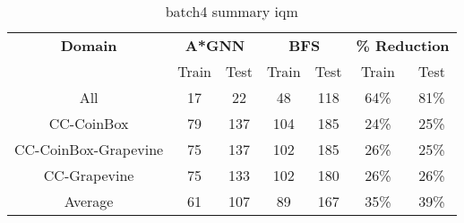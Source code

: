 \begin{table}[!ht]
  \small
  \centering
  \begin{tabular}{c|cc|cc|cc}
    \textbf{Domain}
      & \multicolumn{2}{c|}{\textbf{A*GNN}}
      & \multicolumn{2}{c|}{\textbf{BFS}}
      & \multicolumn{2}{c}{\textbf{\% Reduction}} \\
    \cline{2-7}
    & Train & Test & Train & Test & Train & Test \\
    \hline

    All & 17 & 22 & 48 & 118 & 64\% & 81\% \\
    CC-CoinBox & 79 & 137 & 104 & 185 & 24\% & 25\% \\
    CC-CoinBox-Grapevine & 75 & 137 & 102 & 185 & 26\% & 25\% \\
    CC-Grapevine & 75 & 133 & 102 & 180 & 26\% & 26\% \\
    \hline
    Average & 61 & 107 & 89 & 167 & 35\% & 39\% \\

  \end{tabular}
  \caption{batch4 summary iqm}
  \label{tab:batch4_res}
\end{table}
